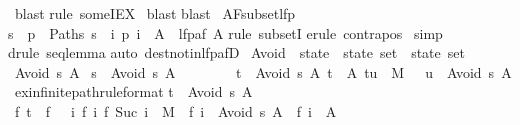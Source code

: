 \begin{isabellebody}
\ blast{\isacharparenright}\isanewline
{}rule\ someIEX{\isacharparenright}\isanewline
\ blast{\isacharparenright}\isanewline
{}blast{\isacharparenright}\isanewline
\isanewline
{}\ AF{\isacharunderscore}subset{\isacharunderscore}lfp{\isacharcolon}\isanewline
{\isachardoublequote}{\isacharbraceleft}s{\isachardot}\ {\isasymforall}\ p\ {\isasymin}\ Paths\ s{\isachardot}\ {\isasymexists}\ i{\isachardot}\ p\ i\ {\isasymin}\ A{\isacharbraceright}\ {\isasymsubseteq}\ lfp{\isacharparenleft}af\ A{\isacharparenright}{\isachardoublequote}\isanewline
{}rule\ subsetI{\isacharparenright}\isanewline
{}erule\ contrapos\isanewline
{}\ simp\isanewline
{}drule\ seq{\isacharunderscore}lemma{\isacharparenright}\isanewline
{}auto\ dest{\isacharcolon}not{\isacharunderscore}in{\isacharunderscore}lfp{\isacharunderscore}afD{\isacharparenright}\isanewline
\isanewline
\isanewline
\isanewline
\isanewline
{}\ Avoid\ {\isacharcolon}{\isacharcolon}\ {\isachardoublequote}state\ {\isasymRightarrow}\ state\ set\ {\isasymRightarrow}\ state\ set{\isachardoublequote}\isanewline
{}\ {\isachardoublequote}Avoid\ s\ A{\isachardoublequote}\isanewline
{}\ {\isachardoublequote}s\ {\isasymin}\ Avoid\ s\ A{\isachardoublequote}\isanewline
\ \ \ \ \ \ \ {\isachardoublequote}{\isasymlbrakk}\ t\ {\isasymin}\ Avoid\ s\ A{\isacharsemicolon}\ t\ {\isasymnotin}\ A{\isacharsemicolon}\ {\isacharparenleft}t{\isacharcomma}u{\isacharparenright}\ {\isasymin}\ M\ {\isasymrbrakk}\ {\isasymLongrightarrow}\ u\ {\isasymin}\ Avoid\ s\ A{\isachardoublequote}\isanewline
\isanewline
\isanewline
{}\ ex{\isacharunderscore}infinite{\isacharunderscore}path{\isacharbrackleft}rule{\isacharunderscore}format{\isacharbrackright}{\isacharcolon}\isanewline
{\isachardoublequote}t\ {\isasymin}\ Avoid\ s\ A\ \ {\isasymLongrightarrow}\isanewline
\ {\isasymforall}f{\isachardot}\ t\ {\isacharequal}\ f\ \ {\isasymlongrightarrow}\ {\isacharparenleft}{\isasymforall}i{\isachardot}\ {\isacharparenleft}f\ i{\isacharcomma}\ f\ {\isacharparenleft}Suc\ i{\isacharparenright}{\isacharparenright}\ {\isasymin}\ M\ {\isasymand}\ f\ i\ {\isasymin}\ Avoid\ s\ A\ {\isasymand}\ f\ i\ {\isasymnotin}\ A{\isacharparenright}\isanewline

\end{isabellebody}
